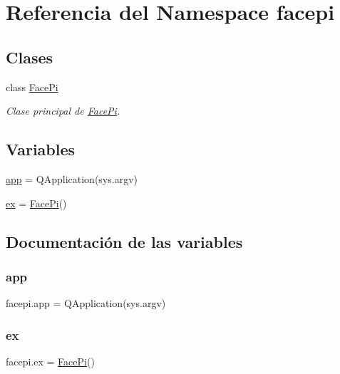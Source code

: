 \hypertarget{namespacefacepi}{}\section{Referencia del Namespace facepi}
\label{namespacefacepi}
\subsection*{Clases}
\begin{DoxyCompactItemize}
\item 
class \mbox{\hyperlink{classfacepi_1_1_face_pi}{Face\+Pi}}
\begin{DoxyCompactList}\small\item\em Clase principal de \mbox{\hyperlink{classfacepi_1_1_face_pi}{Face\+Pi}}. \end{DoxyCompactList}\end{DoxyCompactItemize}
\subsection*{Variables}
\begin{DoxyCompactItemize}
\item 
\mbox{\hyperlink{namespacefacepi_a15b6f38df49cdb5819542c3bb5f9de38}{app}} = Q\+Application(sys.\+argv)
\item 
\mbox{\hyperlink{namespacefacepi_ad59c23499aea037ab53a4bbf70c206ec}{ex}} = \mbox{\hyperlink{classfacepi_1_1_face_pi}{Face\+Pi}}()
\end{DoxyCompactItemize}


\subsection{Documentación de las variables}
\mbox{\label{namespacefacepi_a15b6f38df49cdb5819542c3bb5f9de38}} 
\subsubsection{\texorpdfstring{app}{app}}
{\footnotesize\ttfamily facepi.\+app = Q\+Application(sys.\+argv)}

\mbox{\label{namespacefacepi_ad59c23499aea037ab53a4bbf70c206ec}} 
\subsubsection{\texorpdfstring{ex}{ex}}
{\footnotesize\ttfamily facepi.\+ex = \mbox{\hyperlink{classfacepi_1_1_face_pi}{Face\+Pi}}()}

